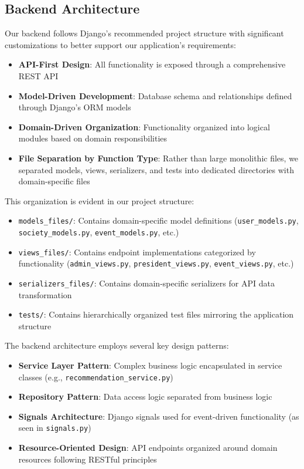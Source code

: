 \subsection{Backend Architecture}

Our backend follows Django's recommended project structure with significant customizations 
to better support our application's requirements:

\begin{itemize}
    \item \textbf{API-First Design}: All functionality is exposed through a comprehensive 
    REST API
    \item \textbf{Model-Driven Development}: Database schema and relationships defined 
    through Django's ORM models
    \item \textbf{Domain-Driven Organization}: Functionality organized into logical modules 
    based on domain responsibilities
    \item \textbf{File Separation by Function Type}: Rather than large monolithic files, 
    we separated models, views, serializers, and tests into dedicated directories with 
    domain-specific files
\end{itemize}

This organization is evident in our project structure:

\begin{itemize}
    \item \texttt{models\_files/}: Contains domain-specific model definitions
    (\texttt{user\_models.py}, \texttt{society\_models.py}, \texttt{event\_models.py}, 
    etc.)
    \item \texttt{views\_files/}: Contains endpoint implementations categorized by 
    functionality (\texttt{admin\_views.py}, \texttt{president\_views.py}, 
    \texttt{event\_views.py}, etc.)
    \item \texttt{serializers\_files/}: Contains domain-specific serializers for API 
    data transformation
    \item \texttt{tests/}: Contains hierarchically organized test files mirroring the 
    application structure
\end{itemize}

The backend architecture employs several key design patterns:

\begin{itemize}
    \item \textbf{Service Layer Pattern}: Complex business logic encapsulated in service 
    classes (e.g., \texttt{recommendation\_service.py})
    \item \textbf{Repository Pattern}: Data access logic separated from business logic
    \item \textbf{Signals Architecture}: Django signals used for event-driven 
    functionality (as seen in \texttt{signals.py})
    \item \textbf{Resource-Oriented Design}: API endpoints organized around domain 
    resources following RESTful principles
\end{itemize}


